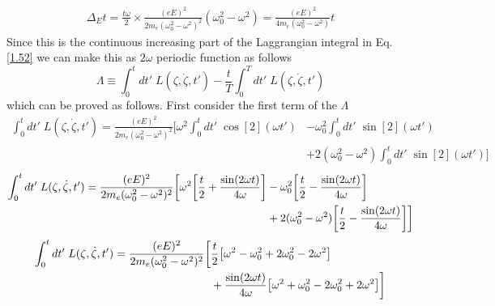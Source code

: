 \begin{equation} \label{3.5}
  \begin{aligned}
    \Delta_E t  =
    \frac{t\omega}{2} \times
    \frac{(eE)^2}{2m_e(\omega_0^2 - \omega^2)^2}
    (\omega_0^2 - \omega^2) =
    \frac{(eE)^2}{4m_e(\omega_0^2 - \omega^2)} t
  \end{aligned}
\end{equation}
Since this is the continuous increasing part of the Laggrangian integral in Eq. \eqref{1.52} we can make this as $2\omega$ periodic function as follows
\begin{equation} \label{3.6}
    \Lambda\equiv
    \int_0^t dt' \; L(\zeta,\dot{\zeta},t') -
    \frac{t}{T} \int_0^T dt' \; L(\zeta,\dot{\zeta},t')
\end{equation}
which can be proved as follows. First consider the first term of the $\Lambda$
\begin{equation} \label{3.7}
  \begin{aligned}
    \int_0^t dt' \; L(\zeta,\dot{\zeta},t') =
    \frac{(eE)^2}{2m_e(\omega_0^2 - \omega^2)^2}
    \bigg[
    \omega^2
    \int_0^t dt' \; \cos[2](\omega t')
    & -
    \omega_0^2
    \int_0^t dt'\; \sin[2](\omega t') \\
    & +
    2(\omega_0^2 - \omega^2) \int_0^t dt'\; \sin[2](\omega t')
    \bigg]
  \end{aligned}
\end{equation}
\begin{equation} \label{3.8}
  \begin{aligned}
    \int_0^t dt' \; L(\zeta,\dot{\zeta},t') =
    \frac{(eE)^2}{2m_e(\omega_0^2 - \omega^2)^2}
    \bigg[
    \omega^2
    \qty[\frac{t}{2} + \frac{\sin(2\omega t)}{4\omega}]
    & -
    \omega_0^2
    \qty[\frac{t}{2} - \frac{\sin(2\omega t)}{4\omega}] \\
    & +
    2(\omega_0^2 - \omega^2)
    \qty[\frac{t}{2} - \frac{\sin(2\omega t)}{4\omega}]
    \bigg]
  \end{aligned}
\end{equation}
\begin{equation} \label{3.9}
  \begin{aligned}
    \int_0^t dt' \; L(\zeta,\dot{\zeta},t')  =
    \frac{(eE)^2}{2m_e(\omega_0^2 - \omega^2)^2}
    \bigg[&
    \frac{t}{2}
    \qty[\omega^2 - \omega_0^2 + 2\omega_0^2 - 2\omega^2] \\
    & +
    \frac{\sin(2\omega t)}{4\omega}
    \qty[\omega^2 + \omega_0^2 - 2\omega_0^2 + 2\omega^2]
    \bigg]
  \end{aligned}
\end{equation}
